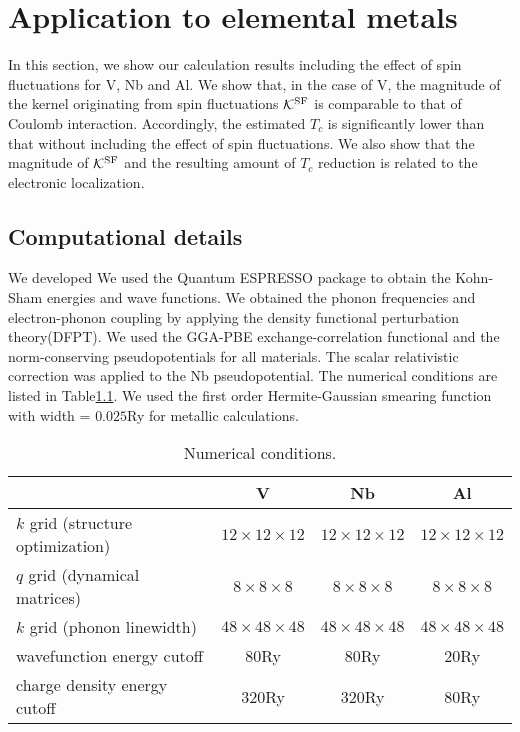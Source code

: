 

%
%
\chapter{Application to elemental metals}
\label{application}
In this section, we show our calculation results including the effect of spin fluctuations 
for V, Nb and Al. We show that, in the case of V, the magnitude of the kernel originating 
from spin fluctuations $\mathcal K^{\rm SF}$ is comparable to that of Coulomb interaction.
Accordingly, the estimated $T_{c}$ is significantly lower than that without including the
effect of spin fluctuations. We also show that the magnitude of $\mathcal K^{\rm SF}$ and the 
resulting amount of $T_{c}$ reduction is related to the electronic localization.

\section{Computational details}
We developed 
We used the Quantum ESPRESSO package\cite{QE} to obtain the Kohn-Sham energies and wave functions.
We obtained the phonon frequencies and electron-phonon coupling by applying the density functional
perturbation theory(DFPT)\cite{DFPT}.
We used the GGA-PBE exchange-correlation functional\cite{GGAPBE} and the norm-conserving 
pseudopotentials\cite{normcons} for all materials. 
The scalar relativistic correction was applied to the Nb pseudopotential.
The numerical conditions are listed in Table\ref{tab:numcond}.
We used the first order Hermite-Gaussian smearing function\cite{Paxton1989} 
with width = $0.025$Ry for metallic calculations.

\begin{table}[hbtp]
	\centering
	\caption{Numerical conditions.}
	\begin{tabular}{lccc}
		\hline \hline
		& V & Nb & Al \\
		\hline
	$k$ grid (structure optimization) & $12\times12\times12$ & $12\times12\times12$ & $12\times12\times12$ \\
	$q$ grid (dynamical matrices) & $ 8\times8\times8$ & $8\times8\times8$ & $8\times8\times8$ \\
	$k$ grid (phonon linewidth) & $48\times48\times48$ & $48\times48\times48$ & $48\times48\times48$ \\
	wavefunction energy cutoff & 80Ry & 80Ry & 20Ry \\
	charge density energy cutoff & 320Ry & 320Ry & 80Ry \\
	\hline \hline
	\end{tabular}
	\label{tab:numcond}
\end{table}

